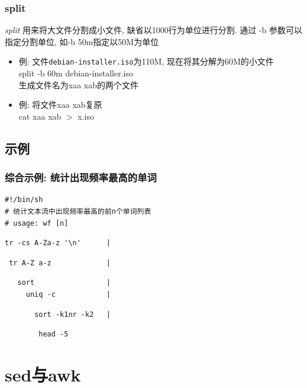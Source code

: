 \documentclass[compress]{beamer}
\begin{document}
\begin{frame}[fragile]
\frametitle{split}
\emph{split} 用来将大文件分割成小文件, 缺省以1000行为单位进行分割.
通过 -b 参数可以指定分割单位, 如-b 50m指定以50M为单位

\begin{itemize}
\item 例: 文件\verb~debian-installer.iso~为110M, 现在将其分解为60M的小文件\\
split -b 60m debian-installer.iso\\
生成文件名为xaa xab的两个文件

\item 例: 将文件xaa xab复原\\
cat xaa xab $>$ x.iso
\end{itemize}

\end{frame}

\subsection{示例}

\begin{frame}[fragile]
\frametitle{综合示例: 统计出现频率最高的单词}
\begin{verbatim}
#!/bin/sh
# 统计文本流中出现频率最高的前n个单词列表
# usage: wf [n]
\end{verbatim}
\pause
\begin{verbatim}
tr -cs A-Za-z '\n'      | 
\end{verbatim}
\pause \vspace{-5ex}
\begin{verbatim}
 tr A-Z a-z             | 
\end{verbatim}
\pause \vspace{-5ex}
\begin{verbatim}
   sort                 | 
     uniq -c            | 
\end{verbatim}
\pause \vspace{-5ex}
\begin{verbatim}
       sort -k1nr -k2   |
\end{verbatim}
\pause \vspace{-5ex}
\begin{verbatim}
        head -5
\end{verbatim}
\end{frame}


\section{sed与awk}
\end{document}
